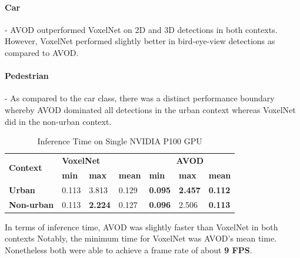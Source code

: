 \paragraph{Car} - AVOD outperformed VoxelNet on 2D and 3D detections in both contexts. However, VoxelNet performed slightly better in bird-eye-view detections as compared to AVOD. 
\paragraph{Pedestrian} - As compared to the car class, there was a distinct performance boundary whereby AVOD dominated all detections in the urban context whereas VoxelNet did in the non-urban context.

\begin{table}[h]%
	\centering
	\begin{tabular}{|l|l|l|l|l|l|l|}
		\hline
		\multirow{2}{*}{\textbf{Context}} & \multicolumn{3}{l|}{\textbf{VoxelNet}} & \multicolumn{3}{c|}{\textbf{AVOD}} \\ \cline{2-7} 
		& \textbf{min} & \textbf{max} & \textbf{mean} & \textbf{min} & \textbf{max} & \textbf{mean} \\ \hline
		\textbf{Urban} & 0.113 & 3.813 & 0.129 & \textbf{0.095} & \textbf{2.457} & \textbf{0.112} \\ \hline
		\textbf{Non-urban} & 0.113 & \textbf{2.224} & 0.127 & \textbf{0.096} & 2.506 & \textbf{0.113} \\ \hline
	\end{tabular}%
	\caption{Inference Time on Single NVIDIA P100 GPU}
	\label{tab:inftime}
\end{table}

In terms of inference time, AVOD was slightly faster than VoxelNet in both contexts Notably, the minimum time for VoxelNet was AVOD's mean time. Nonetheless both were able to achieve a frame rate of about \textbf{9 FPS}. 

